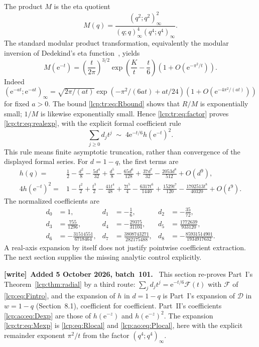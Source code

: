 \documentclass[11pt]{article}
\numberwithin{equation}{section}
\theoremstyle{definition}\newtheorem{definition}[theorem]{Definition}
\theoremstyle{remark}\newtheorem{remark}[theorem]{Remark}
\newcommand{\ee}{\mathrm e}
\newenvironment{writenote}[1][]{\par\smallskip\begingroup\small
 \noindent\textbf{[write]}\if\relax\detokenize{#1}\relax\else~\textbf{#1.}\fi\ }%
 {\par\endgroup\smallskip}
\begin{document}
The product $M$ is the eta quotient
\begin{equation}\label{lcp:tr:eq:eta}
 M(q)=\frac{(q^2;q^2)_\infty^2}
 {(q;q)_\infty^4(q^4;q^4)_\infty}.
\end{equation}
The standard modular product transformation, equivalently the modular inversion of Dedekind's eta function~\cite{lcp-tr-dlmf}, yields
\begin{equation}\label{lcp:tr:eq:Mexp}
 M(\ee^{-t})=\left(\frac{t}{2\pi}\right)^{3/2}
 \exp\!\left(\frac{K}{t}-\frac{t}{6}\right)
 \left(1+O(\ee^{-\pi^2/t})\right).
\end{equation}
Indeed $(\ee^{-at};\ee^{-at})_\infty
=\sqrt{2\pi/(at)}\exp(-\pi^2/(6at)+at/24)
(1+O(\ee^{-4\pi^2/(at)}))$ for fixed $a>0$.
The bound \eqref{lcp:tr:eq:Rbound} shows that $R/M$ is exponentially small; $1/M$ is likewise exponentially small. Hence \eqref{lcp:tr:eq:factor} proves \eqref{lcp:tr:eq:realexp}, with the explicit formal coefficient rule
\begin{equation}\label{lcp:tr:eq:dalgorithm}
 \sum_{j\ge0}d_jt^j\;\sim\;4\ee^{-t/6}h(\ee^{-t})^2.
\end{equation}
This rule means finite asymptotic truncation, rather than convergence of the displayed formal series.
For $d=1-q$, the first terms are
\begin{align*}
 h(q)={}&\frac12-\frac{d^2}{8}-\frac{5d^4}{32}
 +\frac{d^5}{8}-\frac{65d^6}{128}
 +\frac{37d^7}{32}-\frac{2053d^8}{512}+O(d^9),\\
 4h(\ee^{-t})^2={}&1-\frac{t^2}{2}+\frac{t^3}{2}
 -\frac{41t^4}{48}+\frac{7t^5}{4}
 -\frac{6317t^6}{1440}+\frac{1529t^7}{120}
 -\frac{1702513t^8}{40320}+O(t^9).
\end{align*}
The normalized coefficients are
\begin{equation}\label{lcp:tr:eq:dvalues}
\begin{aligned}
 d_0&=1,&d_1&=-\frac16,&d_2&=-\frac{35}{72},\\
 d_3&=\frac{755}{1296},&d_4&=-\frac{29375}{31104},&
 d_5&=\frac{1772639}{933120},\\
 d_6&=-\frac{31514551}{6718464},&d_7&=\frac{3808743271}{282175488},&
 d_8&=-\frac{85931514901}{1934917632}.
\end{aligned}
\end{equation}
A real-axis expansion by itself does not justify pointwise coefficient extraction. The next section supplies the missing analytic control explicitly.

\begin{writenote}[Added 5 October 2026, batch~101]
This section re-proves Part~I's Theorem~\ref{lcp:thm:radial} by a third
route: $\sum_jd_jt^j=\ee^{-t/6}\mathcal F(t)$ with $\mathcal F$ of
\eqref{lcp:eq:Fintro}, and the expansion of $h$ in $d=1-q$ is Part~I's
expansion of $\mathcal D$ in $w=1-q$ (Section~8.1), coefficient for
coefficient. Part~II's coefficients \eqref{lcp:ao:eq:Dexp} are those of
$h(\ee^{-z})$ and $h(\ee^{-z})^2$. The expansion \eqref{lcp:tr:eq:Mexp} is
\eqref{lcp:eq:Rlocal} and \eqref{lcp:ao:eq:Plocal}, here with the explicit
remainder exponent $\pi^2/t$ from the factor $(q^4;q^4)_\infty$.
\end{writenote}
\end{document}
